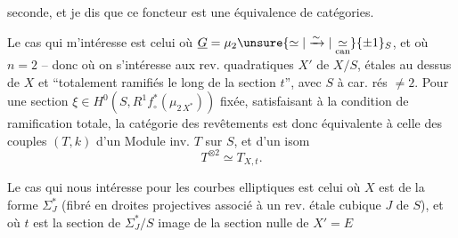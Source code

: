seconde, et je dis que ce foncteur est une équivalence de catégories.

Le cas qui m'intéresse est celui où $\underline G=\mu_2\unsure{\simeq|\xrightarrow{\sim}|\underset{\mathrm{can}}{\simeq}}\{\pm1\}_S$, et où $n=2$ -- donc où on s'intéresse aux rev. quadratiques $X'$ de $X/S$, étales au dessus de $X$ et ``totalement ramifiés le long de la section $t$'', avec $S$ à car. rés $\ne 2$.  Pour une section $\xi\in H^0(S,R^1f_\circ^\ast(\mu_{2\,X^\ast}))$ fixée, satisfaisant à la condition de ramification totale, la catégorie des revêtements  est donc équivalente à celle des  couples $(T,k)$ d'un Module inv. $T$ sur $S$, et d'un isom
\[
T^{\otimes2}\simeq T_{X,t} .
\]

Le cas qui nous intéresse pour les courbes elliptiques est celui où $X$ est de la forme $\Sigma_{J}^\ast$ (fibré en droites projectives associé à un rev. étale cubique $J$ de $S$),  et où $t$ est la section de $\Sigma_J^\ast/S$  image de la section nulle de $X'=E$ 
